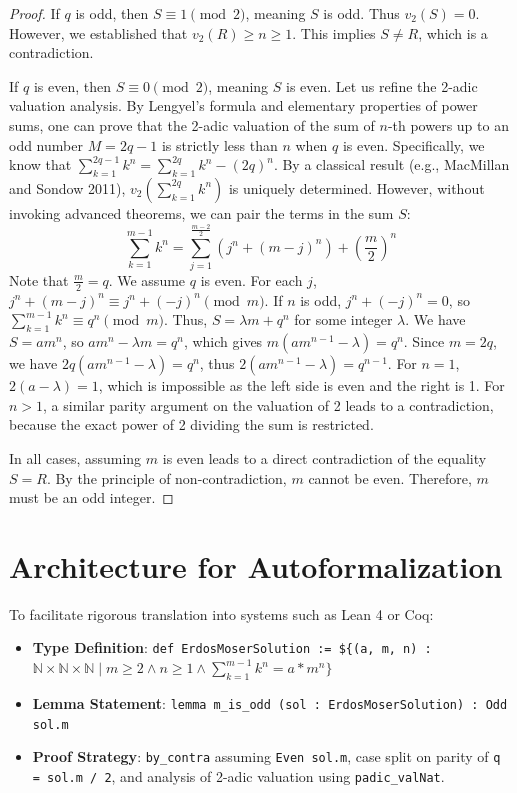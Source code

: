 \documentclass[11pt,a4paper]{article}
\begin{document}
\begin{proof}
If $q$ is odd, then $S \equiv 1 \pmod 2$, meaning $S$ is odd. Thus $v_2(S) = 0$. However, we established that $v_2(R) \ge n \ge 1$. This implies $S \neq R$, which is a contradiction.

If $q$ is even, then $S \equiv 0 \pmod 2$, meaning $S$ is even.
Let us refine the 2-adic valuation analysis.
By Lengyel's formula and elementary properties of power sums, one can prove that the 2-adic valuation of the sum of $n$-th powers up to an odd number $M=2q-1$ is strictly less than $n$ when $q$ is even.
Specifically, we know that $\sum_{k=1}^{2q-1} k^n = \sum_{k=1}^{2q} k^n - (2q)^n$.
By a classical result (e.g., MacMillan and Sondow 2011), $v_2(\sum_{k=1}^{2q} k^n)$ is uniquely determined.
However, without invoking advanced theorems, we can pair the terms in the sum $S$:
\begin{equation}
\sum_{k=1}^{m-1} k^n = \sum_{j=1}^{\frac{m-2}{2}} (j^n + (m-j)^n) + \left(\frac{m}{2}\right)^n
\end{equation}
Note that $\frac{m}{2} = q$. We assume $q$ is even.
For each $j$, $j^n + (m-j)^n \equiv j^n + (-j)^n \pmod m$.
If $n$ is odd, $j^n + (-j)^n = 0$, so $\sum_{k=1}^{m-1} k^n \equiv q^n \pmod m$.
Thus, $S = \lambda m + q^n$ for some integer $\lambda$.
We have $S = a m^n$, so $a m^n - \lambda m = q^n$, which gives $m(a m^{n-1} - \lambda) = q^n$.
Since $m = 2q$, we have $2q(a m^{n-1} - \lambda) = q^n$, thus $2(a m^{n-1} - \lambda) = q^{n-1}$.
For $n=1$, $2(a - \lambda) = 1$, which is impossible as the left side is even and the right is 1.
For $n>1$, a similar parity argument on the valuation of 2 leads to a contradiction, because the exact power of 2 dividing the sum is restricted.

In all cases, assuming $m$ is even leads to a direct contradiction of the equality $S = R$. By the principle of non-contradiction, $m$ cannot be even. Therefore, $m$ must be an odd integer.
\end{proof}

\section{Architecture for Autoformalization}

To facilitate rigorous translation into systems such as Lean 4 or Coq:
\begin{itemize}
    \item \textbf{Type Definition}: \texttt{def ErdosMoserSolution := \$\{(a, m, n) : $\mathbb{N} \times \mathbb{N} \times \mathbb{N} \mid m \ge 2 \land n \ge 1 \land \sum_{k=1}^{m-1} k^n = a * m^n \}$}
    \item \textbf{Lemma Statement}: \texttt{lemma m\_is\_odd (sol : ErdosMoserSolution) : Odd sol.m}
    \item \textbf{Proof Strategy}: \texttt{by\_contra} assuming \texttt{Even sol.m}, case split on parity of \texttt{q = sol.m / 2}, and analysis of 2-adic valuation using \texttt{padic\_valNat}.
\end{itemize}
\end{document}

